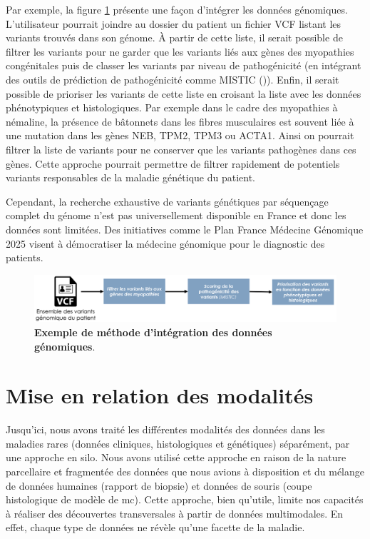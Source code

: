 Par exemple, la figure \ref{fig:variant_discuss} présente une façon d'intégrer les données génomiques. L'utilisateur pourrait joindre au dossier du patient un fichier VCF listant les variants trouvés dans son génome. À partir de cette liste, il serait possible de filtrer les variants pour ne garder que les variants liés aux gènes des myopathies congénitales puis de classer les variants par niveau de pathogénicité (en intégrant des outils de prédiction de pathogénicité comme MISTIC (\cite{chennen_mistic_2020})). Enfin, il serait possible de prioriser les variants de cette liste en croisant la liste avec les données phénotypiques et histologiques. Par exemple dans le cadre des myopathies à némaline, la présence de bâtonnets dans les fibres musculaires est souvent liée à une mutation dans les gènes NEB, TPM2, TPM3 ou ACTA1. Ainsi on pourrait filtrer la liste de variants pour ne conserver que les variants pathogènes dans ces gènes. Cette approche pourrait permettre de filtrer rapidement de potentiels variants responsables de la maladie génétique du patient.

Cependant, la recherche exhaustive de variants génétiques par séquençage complet du génome n'est pas universellement disponible en France et donc les données sont limitées. Des initiatives comme le Plan France Médecine Génomique 2025 visent à démocratiser la médecine génomique pour le diagnostic des patients.
 \begin{figure}[!ht]
 \centering
 \includegraphics[width=1\textwidth]{figures/variant_discuss.png}
 \caption[Exemple de méthode d'intégration des données génomiques]{\textbf{Exemple de méthode d'intégration des données génomiques}.}
 \label{fig:variant_discuss}
\end{figure}

\section{Mise en relation des modalités}
Jusqu’ici, nous avons traité les différentes modalités des données dans les maladies rares (données cliniques, histologiques et génétiques) séparément, par une approche en silo. Nous avons utilisé cette approche en raison de la nature parcellaire et fragmentée des données que nous avions à disposition et du mélange de données humaines (rapport de biopsie) et données de souris (coupe histologique de modèle de \gls{mc}). Cette approche, bien qu'utile, limite nos capacités à réaliser des découvertes transversales à partir de données multimodales. En effet, chaque type de données ne révèle qu'une facette de la maladie. 

